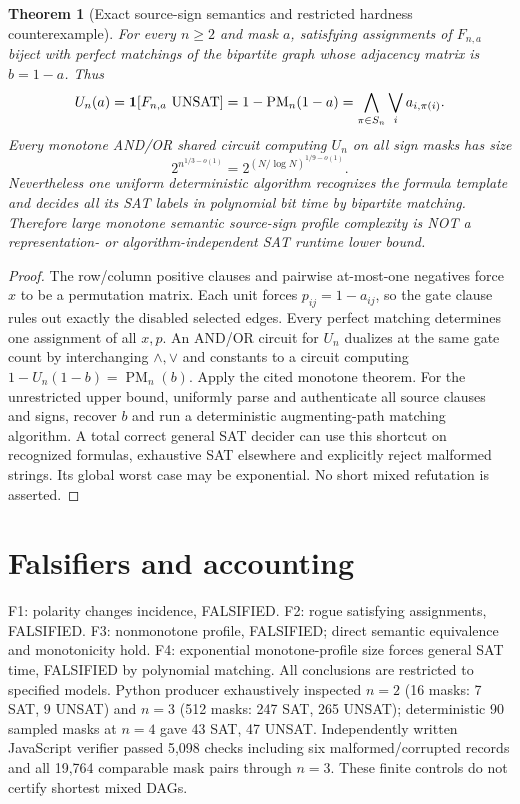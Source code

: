 \documentclass[11pt]{article}
\newtheorem{theorem}{Theorem}
\begin{document}
\begin{theorem}[Exact source-sign semantics and restricted hardness counterexample]
For every $n\ge2$ and mask $a$, satisfying assignments of $F_{n,a}$ biject with perfect matchings of the bipartite graph whose adjacency matrix is $b=1-a$. Thus
\[
U_n(a)={\bf1}[F_{n,a}\ \mathrm{UNSAT}]
=1-\operatorname{PM}_n(1-a)
=\bigwedge_{\pi\in S_n}\bigvee_i a_{i,\pi(i)}.
\]
Every monotone AND/OR shared circuit computing $U_n$ on all sign masks has size
\[
2^{n^{1/3-o(1)}}=2^{(N/\log N)^{1/9-o(1)}}.
\]
Nevertheless one uniform deterministic algorithm recognizes the formula template and decides all its SAT labels in polynomial bit time by bipartite matching. Therefore large monotone semantic source-sign profile complexity is NOT a representation- or algorithm-independent SAT runtime lower bound.
\end{theorem}
\begin{proof}
The row/column positive clauses and pairwise at-most-one negatives force $x$ to be a permutation matrix. Each unit forces $p_{ij}=1-a_{ij}$, so the gate clause rules out exactly the disabled selected edges. Every perfect matching determines one assignment of all $x,p$. An AND/OR circuit for $U_n$ dualizes at the same gate count by interchanging $\wedge,\vee$ and constants to a circuit computing $1-U_n(1-b)=\operatorname{PM}_n(b)$. Apply the cited monotone theorem. For the unrestricted upper bound, uniformly parse and authenticate all source clauses and signs, recover $b$ and run a deterministic augmenting-path matching algorithm. A total correct general SAT decider can use this shortcut on recognized formulas, exhaustive SAT elsewhere and explicitly reject malformed strings. Its global worst case may be exponential. No short mixed refutation is asserted.
\end{proof}

\section*{Falsifiers and accounting}
F1: polarity changes incidence, FALSIFIED. F2: rogue satisfying assignments, FALSIFIED. F3: nonmonotone profile, FALSIFIED; direct semantic equivalence and monotonicity hold. F4: exponential monotone-profile size forces general SAT time, FALSIFIED by polynomial matching. All conclusions are restricted to specified models. Python producer exhaustively inspected $n=2$ (16 masks: 7 SAT, 9 UNSAT) and $n=3$ (512 masks: 247 SAT, 265 UNSAT); deterministic 90 sampled masks at $n=4$ gave 43 SAT, 47 UNSAT. Independently written JavaScript verifier passed 5,098 checks including six malformed/corrupted records and all 19,764 comparable mask pairs through $n=3$. These finite controls do not certify shortest mixed DAGs.
\end{document}
